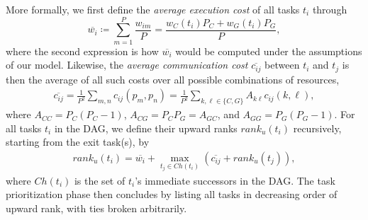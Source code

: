 \documentclass[runningheads]{llncs}
\begin{document}
More formally, we first define the {\em average execution cost} of all tasks $t_i$ through
\begin{equation}
\label{eq.avg_comp}
\overline{w_i} \coloneqq \sum_{m = 1}^{P} \frac{w_{im}}{P} = \frac{w_C(t_i) P_C + w_G(t_i) P_G}{P},
\end{equation}  
where the second expression is how $\overline{w_i}$ would be computed under the assumptions of our model. Likewise, the {\em average communication cost} $\overline{c_{ij}}$ between $t_i$ and $t_j$ is then the average of all such costs over all possible combinations of resources,
\begin{align}
\label{eq.avg_comm}
\overline{c_{ij}} = \frac{1}{P^2}\sum_{m, n} c_{ij}(p_m, p_n) = \frac{1}{P^2}\sum_{k, \ell \in \{ C, G \}} A_{k\ell} c_{ij}(k, \ell),
\end{align}
where $A_{CC} = P_C(P_C - 1)$, $A_{CG} = P_C P_G = A_{GC}$, and $A_{GG} = P_G(P_G - 1)$. 
For all tasks $t_i$ in the DAG, we define their upward ranks $rank_u(t_i)$ recursively, starting from the exit task(s), by
\begin{align}
\label{eq.upward_rank}
rank_u(t_i) = \overline{w_i} + \max_{t_j \in Ch(t_i)} (\overline{c_{ij}} + rank_u(t_j)),
\end{align}
where $Ch(t_i)$ is the set of $t_i$'s immediate successors in the DAG. The task prioritization phase then concludes by listing all tasks in decreasing order of upward rank, with ties broken arbitrarily. 
\end{document}
